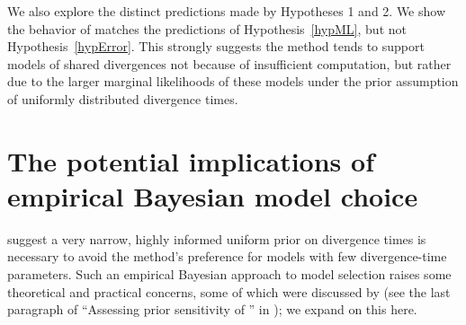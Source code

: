 We also explore the distinct predictions made by Hypotheses 1 and 2.
We show the behavior of \msb matches the predictions of Hypothesis~\ref{hypML},
but not Hypothesis~\ref{hypError}.
This strongly suggests the method tends to support models of shared divergences
not because of insufficient computation, but rather due to the larger marginal
likelihoods of these models under the prior assumption of uniformly distributed
divergence times.



\section{The potential implications of empirical Bayesian model choice}
\citet{Hickerson2013} suggest a very narrow, highly informed uniform prior on
divergence times is necessary to avoid the method's preference for models with
few divergence-time parameters.
Such an empirical Bayesian approach to model selection raises some theoretical
and practical concerns, some of which were discussed by \citet{Oaks2012} (see
the last paragraph of ``Assessing prior sensitivity of \msb'' in
\citet{Oaks2012}); we expand on this here.

